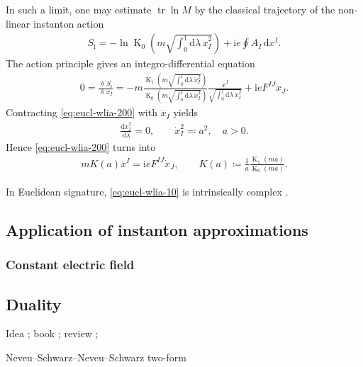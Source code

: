 \documentclass[12pt]{article}
\newcommand\mi{\mathrm{i}} %
\newcommand\dif{\mathrm{d}}
\newcommand\dva{\updelta}
\DeclareMathOperator{\BesselK}{K}
\DeclareMathOperator{\tr}{tr}
\newcommand{\rfun}[2]{{#1}\mathopen{}\left(#2\right)\mathclose{}}
\newcommand{\frde}[2]{{\frac{\dif{#1}}{\dif{#2}}}}
\newcommand{\frdva}[2]{{\frac{\dva{#1}}{\dva{#2}}}}
\begin{document}
In such a limit, one may estimate $\tr\ln M$ by the classical trajectory of the 
non-linear instanton action
\begin{align}
S_\text{i} = -\ln\rfun{\BesselK_0}{m\sqrt{\int_0^1\dif\lambda\, \dot{x}_I^2}}
+ \mi e \oint A_I\,\dif x^I.
\end{align}
The action principle gives an integro-differential equation
\begin{align}
0 = \frdva{S_\text{i}}{x_I} = -m 
\frac{\rfun{\BesselK_1}{m\sqrt{\int_0^1\dif\lambda\, \dot{x}_I^2}}}%
{\rfun{\BesselK_0}{m\sqrt{\int_0^1\dif\lambda\, \dot{x}_I^2}}}
\frac{\ddot{x}^I}{\sqrt{\int_0^1\dif\lambda\, \dot{x}_I^2}} +
	\mi e F^{IJ} \dot{x}_J.
\label{eq:eucl-wlia-200}
\end{align}
Contracting \cref{eq:eucl-wlia-200} with $\dot{x}_I$ yields
\begin{align}
\frde{\dot{x}_I^2}{\lambda} = 0,\qquad
\dot{x}_I^2 \eqqcolon a^2,\quad a > 0.
\end{align}
Hence \cref{eq:eucl-wlia-200} turns into
\begin{align}
m \rfun{K}{a} \ddot{x}^I = \mi e F^{IJ} \dot{x}_J,\qquad
\rfun{K}{a} \coloneqq \frac{1}{a} 
\frac{\rfun{\BesselK_1}{ma}}{\rfun{\BesselK_0}{ma}}.
\label{eq:eucl-wlia-10}
\end{align}

In Euclidean signature, \cref{eq:eucl-wlia-10} is intrinsically complex 
\cite{Dumlu2011}.


\subsection{Application of instanton approximations}
\label{ssec:eucl-appl}

\cite{Dunne2005}

\subsubsection{Constant electric field}
\label{ssec:eucl-appl-cons}

\subsection{Duality}
\label{ssec:eucl-dual}

Idea \cite{Semenoff2011}; book \cite[ch.\ 5]{Casalderrey-Solana2009}; review 
\cite{Kawai2015}; 

Neveu--Schwarz--Neveu--Schwarz two-form \cite{Becker2006}
\end{document}
